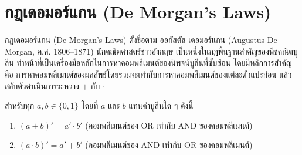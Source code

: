 \section{กฎเดอมอร์แกน (De Morgan's Laws)}


\label{sec:demorgans-laws}

กฎเดอมอร์แกน (De Morgan's Laws) ตั้งชื่อตาม ออกัสตัส เดอมอร์แกน (Augustus De Morgan, ค.ศ. 1806--1871) นักคณิตศาสตร์ชาวอังกฤษ เป็นหนึ่งในกฎพื้นฐานสำคัญของพีชคณิตบูลีน ทำหน้าที่เป็นเครื่องมือหลักในการหาคอมพลีเมนต์ของนิพจน์บูลีนที่ซับซ้อน โดยมีหลักการสำคัญคือ การหาคอมพลีเมนต์ของผลลัพธ์โดยรวมจะเท่ากับการหาคอมพลีเมนต์ของแต่ละตัวแปรก่อน แล้วสลับตัวดำเนินการระหว่าง $+$ กับ $\cdot$~\parencite{mano2018digital}

\begin{thrm}
สำหรับทุก $a, b \in \{0, 1\}$ โดยที่ $a$ และ $b$ แทนค่าบูลีนใด ๆ ดังนี้

\begin{enumerate}
    \item $(a + b)' = a' \cdot b'$ \hfill (คอมพลีเมนต์ของ OR เท่ากับ AND ของคอมพลีเมนต์)
    \item $(a \cdot b)' = a' + b'$ \hfill (คอมพลีเมนต์ของ AND เท่ากับ OR ของคอมพลีเมนต์)
\end{enumerate}
\end{thrm}

